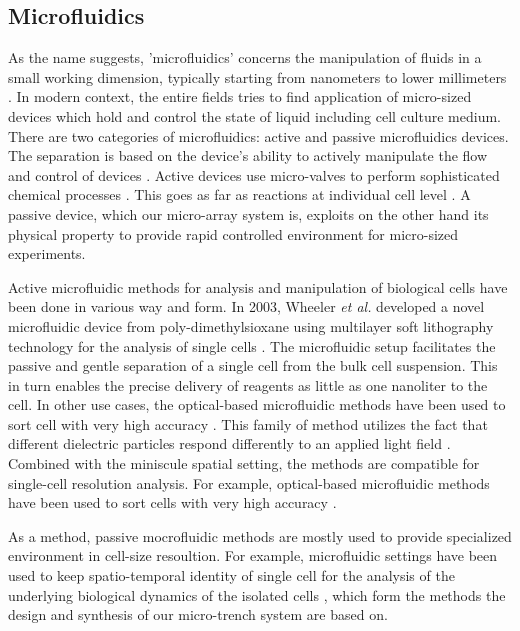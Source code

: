 \documentclass[pdftex,12pt,a4paper]{report}
\begin{document}
\subsection{Microfluidics}

As the name suggests, 'microfluidics' concerns the manipulation of fluids in a small working dimension, typically starting from nanometers to lower millimeters \cite{whitesides2006origins}. In modern context, the entire fields tries to find application of micro-sized devices which hold and control the state of liquid \cite{whitesides2006origins} including cell culture medium. There are two categories of microfluidics: active and passive microfluidics devices. The separation is based on the device's ability to actively manipulate the flow and control of devices \cite{sekhavati2015dynamic}. Active devices use micro-valves to perform sophisticated chemical processes \cite{marsden1993interdisciplinary}. This goes as far as reactions at individual cell level \cite{eyer2012microchamber}. A passive device, which our micro-array system is, exploits on the other hand its physical property to provide rapid controlled environment for micro-sized experiments.

Active microfluidic methods for analysis and manipulation of biological cells have been done in various way and form. In 2003, Wheeler \textit{et al.} developed a novel microfluidic device from poly-dimethylsioxane using multilayer soft lithography technology for the analysis of single cells \cite{wheeler2003microfluidic}. The microfluidic setup facilitates the passive and gentle separation of a single cell from the bulk cell suspension. This in turn enables the precise delivery of reagents as little as one nanoliter to the cell. In other use cases, the optical-based microfluidic methods have been used to sort cell with very high accuracy \cite{macdonald2003microfluidic}. This family of method utilizes the fact that different dielectric particles respond differently to an applied light field \cite{tatarkova2003brownian}. Combined with the miniscule spatial setting, the methods are compatible for single-cell resolution analysis. For example, optical-based microfluidic methods have been used to sort cells with very high accuracy \cite{macdonald2003microfluidic, wang2005microfluidic, baret2009fluorescence}.

As a method, passive mocrofluidic methods are mostly used to provide specialized environment in cell-size resoultion. For example, microfluidic settings have been used to keep spatio-temporal identity of single cell for the analysis of the underlying biological dynamics of the isolated cells \cite{mu2013microfluidics, sekhavati2015marker}, which form the methods the design and synthesis of our micro-trench system are based on.
\end{document}
